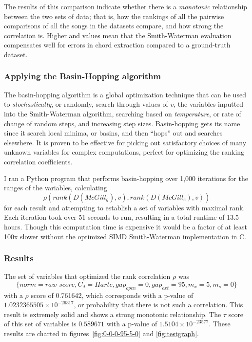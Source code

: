 The results of this comparison indicate whether there is a \textit{monotonic} relationship between the two sets of data; that is, how the rankings of all the pairwise comparisons of all the songs in the datasets compare, and how strong the correlation is. Higher \rho and \tau values mean that the Smith-Waterman evaluation compensates well for errors in chord extraction compared to a ground-truth dataset.

\subsubsection{Applying the Basin-Hopping algorithm}

The basin-hopping algorithm\cite{wales1997global} is a global optimization technique that can be used to \textit{stochastically}, or randomly, search through values of $v$, the variables inputted into the Smith-Waterman algorithm, searching based on \textit{temperature}, or rate of change of random steps, and increasing step sizes. Basin-hopping gets its name since it search local minima, or basins, and then ``hops'' out and searches elsewhere. It is proven to be effective for picking out satisfactory choices of many unknown variables for complex computations, perfect for optimizing the ranking correlation coefficients.

I ran a Python program that performs basin-hopping over 1,000 iterations for the ranges of the variables, calculating \[\rho(rank(D({McGill}_{g}),v), rank(D({McGill}_{e}),v))\] for each result and attempting to establish a set of variables with maximal rank. Each iteration took over 51 seconds to run, resulting in a total runtime of 13.5 hours. Though this computation time is expensive it would be a factor of at least 100x slower without the optimized SIMD Smith-Waterman implementation in C.

\subsubsection{Results}

The set of variables that optimized the rank correlation $\rho$ was \[ \{norm=\textit{raw score}, C_d=Harte, {gap}_{open}=0, {gap}_{ext}=95, m_x=5, m_s=0\} \] with a $\rho$ score of 0.761642, which corresponds with a p-value of $1.0232365505\times 10^{-26317}$, or probability that there is not such a correlation. This result is extremely solid and shows a strong monotonic relationship. The $\tau$ score of this set of variables is $0.589671$ with a p-value of $1.5104 \times 10^{-23577}$. These results are charted in figures~\ref{fig:0-0-0-95-5-0} and \ref{fig:testgraph}.



